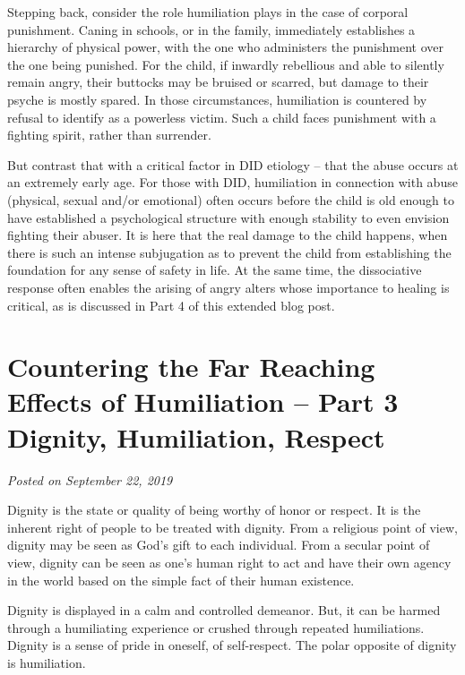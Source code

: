 \documentclass[]{book}
\begin{document}
Stepping back, consider the role humiliation plays in the case of corporal punishment. Caning in schools, or in the family, immediately establishes a hierarchy of physical power, with the one who administers the punishment over the one being punished. For the child, if inwardly rebellious and able to silently remain angry, their buttocks may be bruised or scarred, but damage to their psyche is mostly spared. In those circumstances, humiliation is countered by refusal to identify as a powerless victim. Such a child faces punishment with a fighting spirit, rather than surrender.

But contrast that with a critical factor in DID etiology -- that the abuse occurs at an extremely early age. For those with DID, humiliation in connection with abuse (physical, sexual and/or emotional) often occurs before the child is old enough to have established a psychological structure with enough stability to even envision fighting their abuser. It is here that the real damage to the child happens, when there is such an intense subjugation as to prevent the child from establishing the foundation for any sense of safety in life. At the same time, the dissociative response often enables the arising of angry alters whose importance to healing is critical, as is discussed in Part 4 of this extended blog post.

\hypertarget{countering-the-far-reaching-effects-of-humiliation-part-3-dignity-humiliation-respect}{%
\section{Countering the Far Reaching Effects of Humiliation -- Part 3 Dignity, Humiliation, Respect}\label{countering-the-far-reaching-effects-of-humiliation-part-3-dignity-humiliation-respect}}

\emph{Posted on September 22, 2019}

Dignity is the state or quality of being worthy of honor or respect. It is the inherent right of people to be treated with dignity. From a religious point of view, dignity may be seen as God's gift to each individual. From a secular point of view, dignity can be seen as one's human right to act and have their own agency in the world based on the simple fact of their human existence.

Dignity is displayed in a calm and controlled demeanor. But, it can be harmed through a humiliating experience or crushed through repeated humiliations. Dignity is a sense of pride in oneself, of self-respect. The polar opposite of dignity is humiliation.
\end{document}
